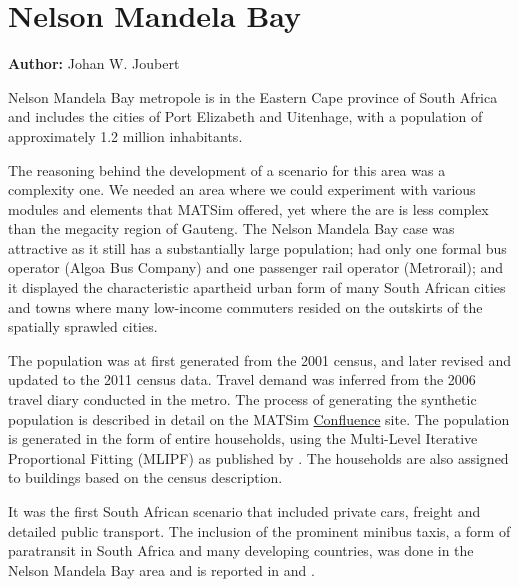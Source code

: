 \section{Nelson Mandela Bay}
\label{sec:nelsonMandelaBay}
\hfill \textbf{Author:} Johan W. Joubert

Nelson Mandela Bay metropole is in the Eastern Cape province of South Africa and includes the cities of Port Elizabeth and Uitenhage, with a population of approximately 1.2 million inhabitants.

The reasoning behind the development of a scenario for this area was a complexity one. We needed an area where we could experiment with various modules and elements that MATSim offered, yet where the are is less complex than the megacity region of Gauteng. The Nelson Mandela Bay case was attractive as it still has a substantially large population; had only one formal bus operator (Algoa Bus Company) and one passenger rail operator (Metrorail); and it displayed the characteristic apartheid urban form of many South African cities and towns where many low-income commuters resided on the outskirts of the spatially sprawled cities.

The population was at first generated from the 2001 census, and later revised and updated to the 2011 census data. Travel demand was inferred from the 2006 travel diary conducted in the metro. The process of generating the synthetic population is described in detail on the MATSim \href{https://matsim.atlassian.net/wiki/display/MATPUB/South+Africa}{Confluence} site. The population is generated in the form of entire households, using the Multi-Level Iterative Proportional Fitting (MLIPF) as published by \citet[][]{MuellerKAxhausen_LATSIS_2012}. The households are also assigned to buildings based on the census description.

It was the first South African scenario that included private cars, freight and detailed public transport. The inclusion of the prominent minibus taxis, a form of paratransit in South Africa and many developing countries, was done in the Nelson Mandela Bay area and is reported in \citet[][]{Roeder2013MasterMinibus} and \citet[][]{NeumannEtAl2014MinibusRSA}.

